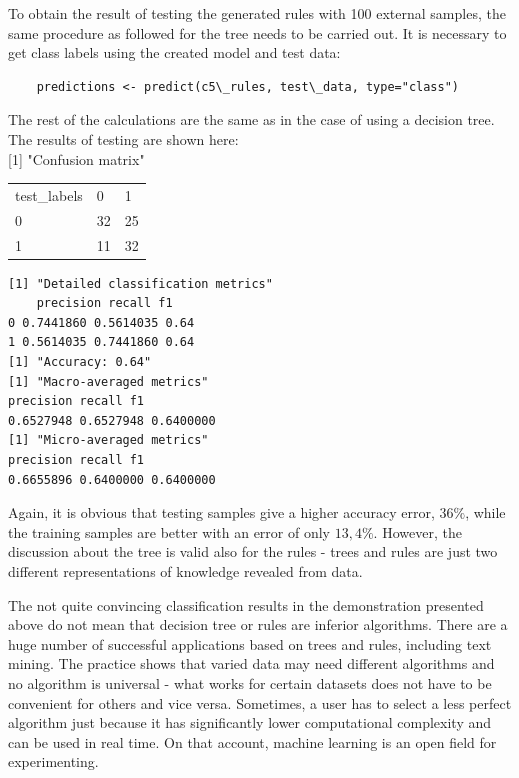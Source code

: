 To obtain the result of testing the generated rules with 100 external samples, the same procedure as followed for the tree needs to be carried out. It is necessary to get class labels using the created model and test data:
\begin{verbatim}
    predictions <- predict(c5\_rules, test\_data, type="class")
\end{verbatim}
The rest of the calculations are the same as in the case of using a decision tree. The results of testing are shown here:\\[0pt]
[1] "Confusion matrix"
\begin{flushleft}
\begin{tabular}{lll}
test\_labels & 0 & 1 \\
0 & 32 & 25 \\
1 & 11 & 32 \\
\end{tabular}
\end{flushleft}

\begin{verbatim}
[1] "Detailed classification metrics"
    precision recall f1
0 0.7441860 0.5614035 0.64
1 0.5614035 0.7441860 0.64
[1] "Accuracy: 0.64"
[1] "Macro-averaged metrics"
precision recall f1
0.6527948 0.6527948 0.6400000
[1] "Micro-averaged metrics"
precision recall f1
0.6655896 0.6400000 0.6400000
\end{verbatim}

Again, it is obvious that testing samples give a higher accuracy error, $36 \%$, while the training samples are better with an error of only $13,4 \%$. However, the discussion about the tree is valid also for the rules - trees and rules are just two different representations of knowledge revealed from data.

The not quite convincing classification results in the demonstration presented above do not mean that decision tree or rules are inferior algorithms. There are a huge number of successful applications based on trees and rules, including text mining. The practice shows that varied data may need different algorithms and no algorithm is universal \cite{ref282} - what works for certain datasets does not have to be convenient for others and vice versa. Sometimes, a user has to select a less perfect algorithm just because it has significantly lower computational complexity and can be used in real time. On that account, machine learning is an open field for experimenting.